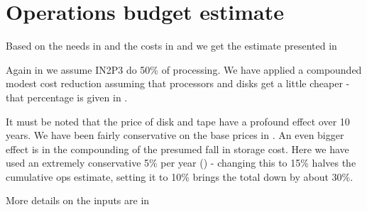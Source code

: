 \section{Operations budget estimate}\label{sec:opscost}
Based on the needs in  and the costs in  and 
we get the estimate presented in 



Again in  we assume IN2P3 do 50\% of processing.
We have applied a compounded modest cost reduction assuming that processors  and disks get a little cheaper - that
percentage is given in .

It must be noted that the price of disk and tape have a profound effect over 10 years. We have been fairly conservative on the base prices
in . An even bigger effect is in the compounding of the presumed fall in storage cost. Here we have used an extremely
conservative 5\% per year () - changing this to 15\% halves the cumulative ops estimate, setting it to 10\% brings the
total down by about 30\%.

More details on the inputs are in 


